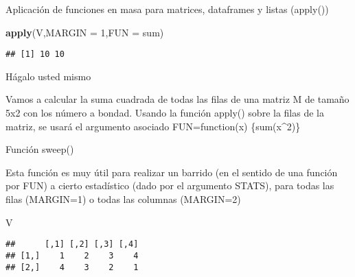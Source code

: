 \documentclass[ignorenonframetext,]{beamer}
\newenvironment{Shaded}{\begin{snugshade}}{\end{snugshade}}
\newcommand{\KeywordTok}[1]{\textcolor[rgb]{0.13,0.29,0.53}{\textbf{#1}}}
\newcommand{\DataTypeTok}[1]{\textcolor[rgb]{0.13,0.29,0.53}{#1}}
\newcommand{\DecValTok}[1]{\textcolor[rgb]{0.00,0.00,0.81}{#1}}
\newcommand{\NormalTok}[1]{#1}
\begin{document}
\begin{frame}[fragile]{Aplicación de funciones en masa para matrices,
dataframes y listas (apply())}

\begin{Shaded}
\begin{Highlighting}[]
\KeywordTok{apply}\NormalTok{(V,}\DataTypeTok{MARGIN =} \DecValTok{1}\NormalTok{,}\DataTypeTok{FUN =}\NormalTok{ sum)}
\end{Highlighting}
\end{Shaded}

\begin{verbatim}
## [1] 10 10
\end{verbatim}

\end{frame}

\begin{frame}{Hágalo usted mismo}

Vamos a calcular la suma cuadrada de todas las filas de una matriz M de
tamaño 5x2 con los número a bondad. Usando la función apply() sobre la
filas de la matriz, se usará el argumento asociado FUN=function(x)
\{sum(x\^{}2)\}

\end{frame}

\begin{frame}[fragile]{Función sweep()}

Esta función es muy útil para realizar un barrido (en el sentido de una
función por FUN) a cierto estadístico (dado por el argumento STATS),
para todas las filas (MARGIN=1) o todas las columnas (MARGIN=2)

\begin{Shaded}
\begin{Highlighting}[]
\NormalTok{V}
\end{Highlighting}
\end{Shaded}

\begin{verbatim}
##      [,1] [,2] [,3] [,4]
## [1,]    1    2    3    4
## [2,]    4    3    2    1
\end{verbatim}

\end{frame}
\end{document}
